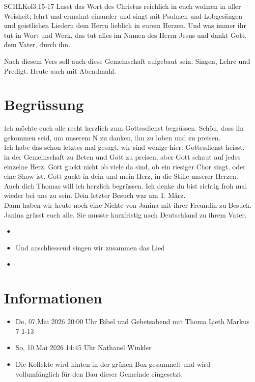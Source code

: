 \documentclass[fontsize=14pt]{../../inc/mybib}
\newcommand{\Name}{Thomas}
\begin{document}
\begin{bibelbox}{SCHL}{Kol}{3:15-17}
    Lasst das Wort des Christus reichlich in euch wohnen in aller Weisheit; lehrt und ermahnt einander und singt mit Psalmen und Lobgesängen und geistlichen Liedern dem Herrn lieblich in eurem Herzen. Und was immer ihr tut in Wort und Werk, das tut alles im Namen des Herrn Jesus und dankt Gott, dem Vater, durch ihn.
\end{bibelbox}
Nach diesem Vers soll auch diese Gemeinschaft aufgebaut sein. Singen, Lehre und Predigt. Heute auch mit Abendmahl.
\section{Begrüssung}
Ich möchte euch alle recht herzlich zum Gottesdienst begrüssen. Schön, dass ihr gekommen seid, um unserem \herr N zu danken, ihn zu loben und zu preisen.\\
Ich habe das schon letztes mal gesagt, wir sind wenige hier. Gottesdienst heisst, in der Gemeinschaft zu Beten und Gott zu preisen, aber Gott schaut auf jedes einzelne Herz. Gott guckt nicht ob viele da sind, ob ein riesiger Chor singt, oder eine Show ist. Gott guckt in dein und mein Herz, in die Stille unserer Herzen. \\
Auch dich \Name{} will ich herzlich begrüssen. Ich denke du bist richtig froh mal wieder bei uns zu sein. Dein letzter Besuch war am 1. März.\\
Dann haben wir heute noch eine Nichte von Janina mit ihrer Freundin zu Besuch.\\
Janina grüsst euch alle. Sie musste kurzfristig nach Deutschland zu ihrem Vater. 
\begin{itemize}
    \item[] 
    \item[] Und anschliessend singen wir zusammen das Lied
    \item[] 
\end{itemize}
\newpage
\section{Informationen}
\begin{itemize}
    \item {} Do, 07.Mai 2026 20:00 Uhr Bibel und Gebetsabend mit Thoma Lieth Markus 7 1-13
    \item {} So, 10.Mai 2026 14:45 Uhr Nathanel Winkler

    \item {} Die Kollekte wird hinten in der grünen Box gesammelt und wird vollumfänglich für den Bau dieser Gemeinde eingesetzt.
\end{itemize}
\end{document}
